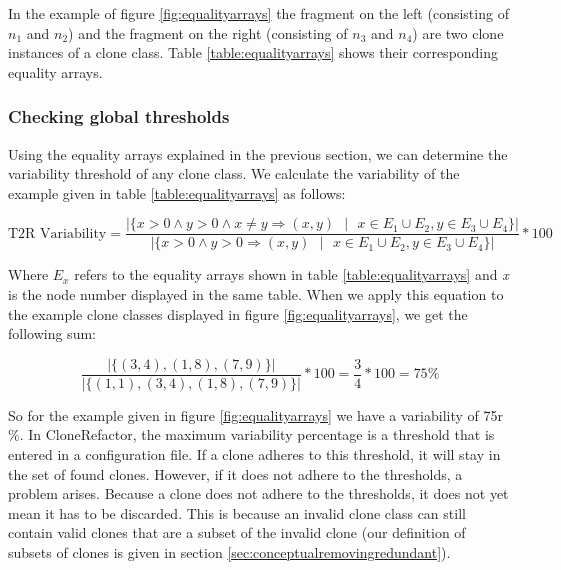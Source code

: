 In the example of figure \ref{fig:equalityarrays} the fragment on the left (consisting of $n_1$ and $n_2$) and the fragment on the right (consisting of $n_3$ and $n_4$) are two clone instances of a clone class. Table \ref{table:equalityarrays} shows their corresponding equality arrays.

\subsubsection{Checking global thresholds} \label{sec:t2rcheckglobalthres}
Using the equality arrays explained in the previous section, we can determine the variability threshold of any clone class. We calculate the variability of the example given in table \ref{table:equalityarrays} as follows:

\begin{equation}\label{eq:variabilityclonerefactor}
\text{T2R Variability} = \frac{|\{x>0 \land y>0 \land x \neq y \Rightarrow (x,y) \text{ }|\text{ }x \in E_1 \cup E_2, y \in E_3 \cup E_4\}|}{|\{x>0 \land y>0 \Rightarrow (x,y) \text{ }|\text{ }x \in E_1 \cup E_2, y \in E_3 \cup E_4\}|}*100
\end{equation}

Where $E_x$ refers to the equality arrays shown in table \ref{table:equalityarrays} and \textit{x} is the node number displayed in the same table. When we apply this equation to the example clone classes displayed in figure \ref{fig:equalityarrays}, we get the following sum:

\begin{equation}\label{eq:sumequality}
\frac{|\{(3,4), (1,8), (7,9)\}|}{|\{(1,1), (3,4), (1,8), (7,9)\}|}*100 = \frac{3}{4}*100 = 75\%
\end{equation}

So for the example given in figure \ref{fig:equalityarrays} we have a variability of 75r \%. In CloneRefactor, the maximum variability percentage is a threshold that is entered in a configuration file. If a clone adheres to this threshold, it will stay in the set of found clones. However, if it does not adhere to the thresholds, a problem arises. Because a clone does not adhere to the thresholds, it does not yet mean it has to be discarded. This is because an invalid clone class can still contain valid clones that are a subset of the invalid clone (our definition of subsets of clones is given in section \ref{sec:conceptualremovingredundant}).



